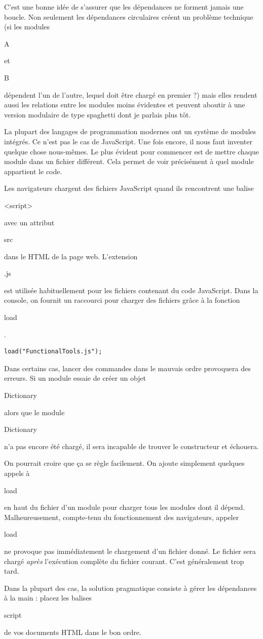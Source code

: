 \documentclass{FramateX}
\renewcommand{\texttt}[1]{\begin{sffamily}{#1}\end{sffamily}}
\begin{document}
C'est une bonne idée de s'assurer que les dépendances ne forment jamais
une boucle. Non seulement les dépendances circulaires créent un problème
technique (si les modules \texttt{A} et \texttt{B} dépendent l'un de
l'autre, lequel doit être chargé en premier ?) mais elles rendent aussi
les relations entre les modules moins évidentes et peuvent aboutir à une
version modulaire de type spaghetti dont je parlais plus tôt.

\begin{center}\end{center}

La plupart des langages de programmation modernes ont un système de
modules intégrés. Ce n'est pas le cas de JavaScript. Une fois encore, il
nous faut inventer quelque chose nous-mêmes. Le plus évident pour
commencer est de mettre chaque module dans un fichier différent. Cela
permet de voir précisément à quel module appartient le code.

Les navigateurs chargent des fichiers JavaScript quand ils rencontrent
une balise \texttt{\textless{}script\textgreater{}} avec un attribut
\texttt{src} dans le HTML de la page web. L'extension \texttt{.js} est
utilisée habituellement pour les fichiers contenant du code JavaScript.
Dans la console, on fournit un raccourci pour charger des fichiers grâce
à la fonction \texttt{load}.

\begin{lstlisting}
load("FunctionalTools.js");
\end{lstlisting}
\begin{center}\end{center}

Dans certains cas, lancer des commandes dans le mauvais ordre provoquera
des erreurs. Si un module essaie de créer un objet \texttt{Dictionary}
alors que le module \texttt{Dictionary} n'a pas encore été chargé, il
sera incapable de trouver le constructeur et échouera.

On pourrait croire que ça se règle facilement. On ajoute simplement
quelques appels à \texttt{load} en haut du fichier d'un module pour
charger tous les modules dont il dépend. Malheureusement, compte-tenu du
fonctionnement des navigateurs, appeler \texttt{load} ne provoque pas
immédiatement le chargement d'un fichier donné. Le fichier sera chargé
\emph{après} l'exécution complète du fichier courant. C'est généralement
trop tard.

Dans la plupart des cas, la solution pragmatique consiste à gérer les
dépendances à la main : placez les balises \texttt{script} de vos
documents HTML dans le bon ordre.
\end{document}
